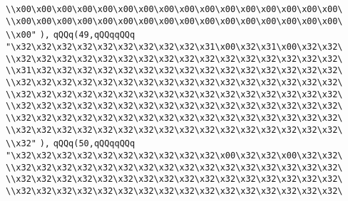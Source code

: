 \verb|\\x00\x00\x00\x00\x00\x00\x00\x00\x00\x00\x00\x00\x00\x00\x00\x00\|\newline
\verb|\\x00\x00\x00\x00\x00\x00\x00\x00\x00\x00\x00\x00\x00\x00\x00\x00\|\newline
\verb|\\x00"|\newline
\verb|),|\newline
\verb|qQQq(49,qQQqqQQq|\newline
\verb|"\x32\x32\x32\x32\x32\x32\x32\x32\x32\x31\x00\x32\x31\x00\x32\x32\|\newline
\verb|\\x32\x32\x32\x32\x32\x32\x32\x32\x32\x32\x32\x32\x32\x32\x32\x32\|\newline
\verb|\\x31\x32\x32\x32\x32\x32\x32\x32\x32\x32\x32\x32\x32\x32\x32\x32\|\newline
\verb|\\x32\x32\x32\x32\x32\x32\x32\x32\x32\x32\x32\x32\x32\x32\x32\x32\|\newline
\verb|\\x32\x32\x32\x32\x32\x32\x32\x32\x32\x32\x32\x32\x32\x32\x32\x32\|\newline
\verb|\\x32\x32\x32\x32\x32\x32\x32\x32\x32\x32\x32\x32\x32\x32\x32\x32\|\newline
\verb|\\x32\x32\x32\x32\x32\x32\x32\x32\x32\x32\x32\x32\x32\x32\x32\x32\|\newline
\verb|\\x32\x32\x32\x32\x32\x32\x32\x32\x32\x32\x32\x32\x32\x32\x32\x32\|\newline
\verb|\\x32"|\newline
\verb|),|\newline
\verb|qQQq(50,qQQqqQQq|\newline
\verb|"\x32\x32\x32\x32\x32\x32\x32\x32\x32\x32\x00\x32\x32\x00\x32\x32\|\newline
\verb|\\x32\x32\x32\x32\x32\x32\x32\x32\x32\x32\x32\x32\x32\x32\x32\x32\|\newline
\verb|\\x32\x32\x32\x32\x32\x32\x32\x32\x32\x32\x32\x32\x32\x32\x32\x32\|\newline
\verb|\\x32\x32\x32\x32\x32\x32\x32\x32\x32\x32\x32\x32\x32\x32\x32\x32\|\newline
